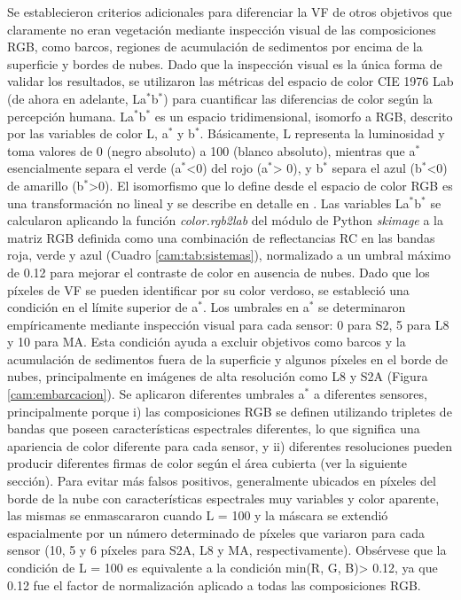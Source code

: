         Se establecieron criterios adicionales para diferenciar la VF de otros objetivos que claramente no eran vegetación mediante inspección visual de las composiciones RGB, como barcos, regiones de acumulación de sedimentos por encima de la superficie y bordes de nubes. Dado que la inspección visual es la única forma de validar los resultados, se utilizaron las métricas del espacio de color CIE 1976 Lab (de ahora en adelante, La$^{*}$b$^{*}$) \cite{cie2016} para cuantificar las diferencias de color según la percepción humana. La$^{*}$b$^{*}$ es un espacio tridimensional, isomorfo a RGB, descrito por las variables de color L, a$^{*}$ y b$^{*}$. Básicamente, L representa la luminosidad y toma valores de 0 (negro absoluto) a 100 (blanco absoluto), mientras que a$^{*}$ esencialmente separa el verde (a$^{*}$<0) del rojo (a$^{*}$> 0), y b$^{*}$ separa el azul (b$^{*}$<0) de amarillo (b$^{*}$>0). El isomorfismo que lo define desde el espacio de color RGB es una transformación no lineal y se describe en detalle en \cite{cie2016}. Las variables La$^{*}$b$^{*}$ se calcularon aplicando la función \textit{color.rgb2lab} del módulo de Python \textit{skimage} a la matriz RGB definida como una combinación de reflectancias RC en las bandas roja, verde y azul (Cuadro \ref{cam:tab:sistemas}), normalizado a un umbral máximo de 0.12 para mejorar el contraste de color en ausencia de nubes. Dado que los píxeles de VF se pueden identificar por su color verdoso, se estableció una condición en el límite superior de a$^{*}$. Los umbrales en a$^{*}$ se determinaron empíricamente mediante inspección visual para cada sensor: 0 para S2, 5 para L8 y 10 para MA. Esta condición ayuda a excluir objetivos como barcos y la acumulación de sedimentos fuera de la superficie y algunos píxeles en el borde de nubes, principalmente en imágenes de alta resolución como L8 y S2A (Figura \ref{cam:embarcacion}). Se aplicaron diferentes umbrales a$^{*}$ a diferentes sensores, principalmente porque i) las composiciones RGB se definen utilizando tripletes de bandas que poseen características espectrales diferentes, lo que significa una apariencia de color diferente para cada sensor, y ii) diferentes resoluciones pueden producir diferentes firmas de color según el área cubierta (ver la siguiente sección). Para evitar más falsos positivos, generalmente ubicados en píxeles del borde de la nube con características espectrales muy variables y color aparente, las mismas se enmascararon cuando L = 100 y la máscara se extendió espacialmente por un número determinado de píxeles que variaron para cada sensor (10, 5 y 6 píxeles para S2A, L8 y MA, respectivamente). Obsérvese que la condición de L = 100 es equivalente a la condición min(R, G, B)> 0.12, ya que 0.12 fue el factor de normalización aplicado a todas las composiciones RGB.


